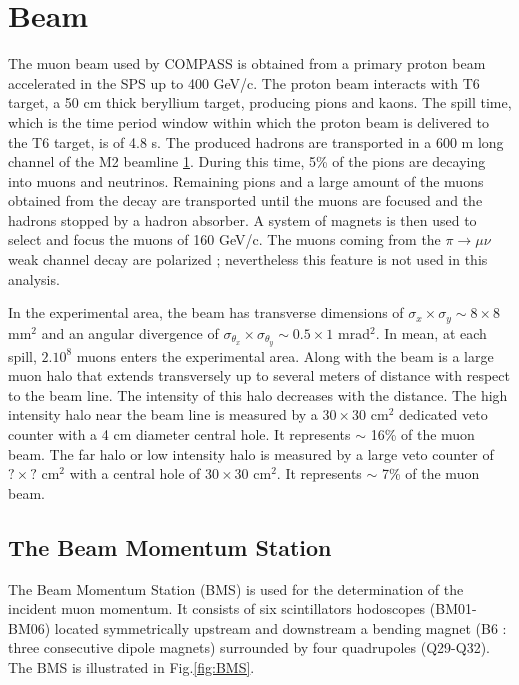 \section{Beam}

The muon beam used by COMPASS is obtained from a primary proton beam accelerated in the SPS up to 400 GeV/c. The proton
beam interacts with T6 target, a 50 cm thick beryllium target, producing pions and kaons. The spill time, which is the
time period window within which the proton beam is delivered to the T6 target, is of 4.8 s. The produced hadrons are
transported in a 600 m long channel of the M2 beamline \ref{}. During this time, 5\% of the pions are decaying into
muons and neutrinos. Remaining pions and a large amount of the muons obtained from the decay are transported until the
muons are focused and the hadrons stopped by a hadron absorber. A system of magnets is then used to select and focus
the muons of 160 GeV/c. The muons coming from the $\pi \rightarrow \mu\nu$ weak channel decay are polarized ;
nevertheless this feature is not used in this analysis.

In the experimental area, the beam has transverse dimensions of $\sigma_x \times \sigma_y \sim 8 \times 8 $ mm$^2$ and
an angular divergence of $\sigma_{\theta_x} \times \sigma_{\theta_y} \sim 0.5 \times 1 $ mrad$^2$. In mean, at each spill,
$2.10^8$ muons enters the experimental area. Along with the beam is a large muon halo that extends transversely up to
several meters of distance with respect to the beam line. The intensity of this halo decreases with the distance. The high
intensity halo near the beam line is measured by a $30 \times 30$ cm$^2$ dedicated veto counter with a 4 cm diameter central
hole. It represents $\sim$ 16\% of the muon beam. The far halo or low intensity halo is measured by a large veto counter of
$? \times ?$ cm$^2$ with a central hole of $30 \times 30$ cm$^2$. It represents $\sim$ 7\% of the muon beam.

\subsection*{The Beam Momentum Station}

The Beam Momentum Station (BMS) is used for the determination of the incident muon momentum. It consists of six scintillators
hodoscopes (BM01-BM06) located symmetrically upstream and downstream a bending magnet (B6 : three consecutive dipole magnets)
surrounded by four quadrupoles (Q29-Q32). The BMS is illustrated in Fig.\ref{fig:BMS}.

